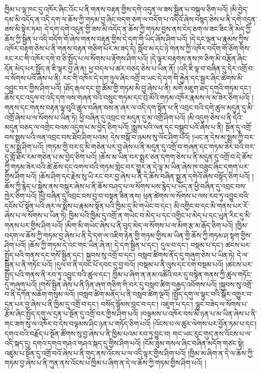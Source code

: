 ཁྱིམ་པ་ལྷ་ཁང་དུ་འཁོར་ཞིང་འོང་པ་ནི་གནས་བརྟན་གྱིས་དགེ་འདུན་ལ་ཟས་སྦྱིན་པ་བསྐུལ་ཅིག་པའོ། །མི་བྱེད་དམ་མི་འདོད་ན་འདི་དག་ལ་ཆོས་ཀྱི་གཏམ་བྱ་ཞིང་བདག་ཅག་ལ་བདོག་པ་འདིའོ་ཞེས་བསྙད་ཅེས་པ་ནི་དགེ་འདུན་ཟས་མི་སྟེར་ཏམ། དེ་དག་དགེ་འདུན་གྱི་ཟས་མི་འདོད་ན་ཆོས་ཀྱི་གཏམ་བྱས་ནས་ངེད་ཅག་ལ་ཟང་ཟིང་ནི་མེད་ཀྱི་ཆོས་ཀྱི་སྦྱིན་པ་འདི་བདོག་གོ་ཞེས་གནས་བརྟན་གྱིས་དེ་དག་གི་ཡིད་ཞོས་ཤིག་པའོ། །དེ་དང་ལྡན་པ་རྣམས་ཀྱིས་འཁོར་བརྟག་ཅེས་པ་ནི་གནས་བརྟན་གཅིག་པོར་མ་ཟད་དེ། སློབ་མ་དང་ཉེ་གནས་ཀྱི་འཁོར་བདོག་གོ་ཅོག་གིས་རང་རང་གི་འཁོར་དགེ་བ་ཅི་སྤྱོད་པ་ལ་སོགས་པ་རྟོགས་ཤིག་པའོ། །དེ་ལྟར་བརྟགས་ནས་ཁ་ཅིག་མི་བརྩོན་ཞིང་དོན་མེད་པར་སྤྱོད་ན་ཇི་ལྟར་བྱ་ཞེ་ན། ཕྱ་བདལ་པ་ཚར་བཅད་ཅེས་པ་ཡིན་ནོ། །འདི་ཇི་ལྟ་བ་བཞིན་དུ་དེར་འགྲོ་བ་ལ་སོགས་པའོ་ཞེས་པ་ནི། རང་གི་འཁོར་དེ་དག་ཉུལ་ཞིང་འགྲོ་བ་ཡང་དེ་དག་གི་རྐྱེན་དང་སྦྱར་ཞིང་ཚེགས་མི་འབྱུང་བར་གྱིས་ཤིག་པའོ། །ཐོད་རྒལ་དང་གྱ་ཚོམ་གྱི་གཏམ་མི་བྱ་ཞེས་པ་ནི། མགོ་མཇུག་ཐད་དགུའི་གཏམ་དང་། ཆོས་དང་འདུལ་བ་འདི་དག་ལས་གཞན་བའི་བསྲུང་གཏམ་དང་བྲེ་མོའི་གཏམ་འཁོར་རྣམས་ལ་མ་ཟེར་ཅིག་པའོ། །གནས་དང་གནས་བརྟན་ལྟ་བུའི་ཚུལ་བཞིན་བས་ན་ཞར་ལ་འདི་དག་སྟོན་པ་ནི་འབྲང་བའི་དགེ་ཚུལ་མདུན་དུ་མི་འགྲོ་ཞེས་པ་ལ་སོགས་པ་ཡིན་ཏེ། ཕྱི་བཞིན་དུ་འབྲང་བ་མདུན་དུ་མ་འགྲོ་ཤིག་པའོ། །མི་འདུག་ཅེས་པ་ནི་དེའི་མདུན་བཅད་ལ་འགྲེང་བའམ་འདུག་པ་མ་བྱེད་ཅིག་པའོ། །སྨྲས་པའི་ལན་དང་བསྒྲུབ་པའོ་ཞེས་པ་ནི། སྔོན་དུ་འགྲོ་བས་སྨྲས་པའི་ལན་འབྲང་བས་ཐོབ་ཤིག་པའམ། དེས་བསྒོ་བ་ཉམས་སུ་ལོང་ཤིག་པའོ། །ཡང་ན་དེས་མ་སྨྲས་ཀྱི་བར་དུ་མ་སྨྲ་ཤིག་པའོ། །གཏམ་གྱི་བར་དུ་མི་གཅེན་པར་བྱ་ཞེས་པ་ནི་མདུན་དུ་འགྲོ་བ་གཞན་དང་གཏམ་ཟེར་བའི་བར་དུ་གློ་ཐོར་རམ་གཅེན་པ་མ་བྱེད་ཅིག་པའོ། །ཆོས་མ་ཡིན་བར་སྨྲར་ཅན་དགག་ཅེས་པ་ནི་མདུན་དུ་འགྲོ་བ་དེ་ཆོས་ཀྱི་གཏམ་ཟེར་བའི་ཚེ་ཆོས་དང་འགལ་བའི་གཏམ་གླེང་བར་གྱུར་ན་དེ་ལྟ་མ་ཡིན་ཞེས་ཁ་བཟུང་ཞིང་དགག་པར་གྱིས་ཤིག་པའོ། །ཆོས་ཤིག་དང་རྗེས་སུ་ཡི་རང་བར་བྱ་ཞེས་པ་ནི་དེ་ཆོས་བཞིན་སྨྲ་ན་དགེའོ་ཞེས་བསྟོད་ཅིག་པའོ། །ཆོས་ཀྱི་རྙེད་པ་སྐྱེས་ནས་བསྐུར་ཞེས་པ་ནི་ཆོས་བཤད་པ་ལ་སོགས་པས་རྙེད་པ་ཡོད་ན་ཕྱི་བཞིན་དུ་འབྲང་བས་ཁྱེར་ཅིག་པའོ། །ཕྱི་བཞིན་དུ་འབྲང་བས་བྱ་བ་བསྟན་ཟིན་ནས། ཕྲན་ཚེགས་ལ་སོགས་པ་ལས་རབ་ཏུ་འབྱུང་བའི་དངོས་པོ་སྟོན་པའི་ཞར་ལ་སྨོས་པ་རྣམས་སྟོན་པའི་ཁྱིམ་དུ་མི་གཡེང་བ་དང་། མི་འགྱིང་བ་དང་མི་གནས་པར་རོ་ཞེས་པ་ལ་སོགས་པ་ཡིན་ཏེ། ཁྱིམ་པའི་ཁྱིམ་དུ་འགྲོ་ན་གཡེང་བ་མེད་པ་དང་འགྱིང་པ་མེད་པ་དང་ཡུན་རིང་དུ་མི་གནས་པར་གྱིས་ཤིག་པའོ། །མིག་མི་གཡེང་ཞེས་པ་ནི་བུད་མེད་ལ་སོགས་པ་ལ་མིག་རྩ་མ་རྒོད་ཅིག་པའོ། །ཁྱིམ་བདག་ལ་ཆོས་ཀྱི་གཏམ་བྱ་ཞེས་པ་ནི་དེ་དག་ལ་འཇིག་རྟེན་གྱི་གཏམ་གྱིས་མ་ཡིན་གྱི་ཆོས་ཀྱི་གཏམ་ཤ་སྟག་གྱིས་ཤིག་པའོ། །ཆོས་ཀྱི་གཏམ་དེ་འང་གང་ཡིན་ཞེ་ན། དེ་དག་སྦྱིན་པ་དང་། དུལ་བ་དང་། བསྡམ་པ་དང་། ཚངས་པར་སྤྱོད་པའི་གནས་དང་གསོ་སྦྱིན་དང་། སྐྱབས་སུ་འགྲོ་བ་དང་། བསླབ་ཚིགས་ནོད་དུ་གཞུག་ཅེས་པ་ཡིན་ཏེ། དེ་ལ་སྦྱིན་པ་ནི་གཏོང་པའོ། །དུལ་བ་ནི་དབང་པོ་དབང་དུ་བྱ་བའོ། །བསྡམ་པ་ནི་ལུས་དང་ངག་བསྡམ་པའོ། །ཚངས་པར་སྤྱོད་པའི་གནས་ནི་རབ་ཏུ་འབྱུང་བའི་ཚུལ་དང་། ཁྱིམ་པ་ཞིག་ན་ནམ་འཚོའི་བར་དུ་བསྙེན་གནས་ཀྱི་ཚུལ་གཏོང་དུ་གཞུག་པའོ། །གསོ་སྦྱིན་ཞེས་པ་ནི་ཉིན་ཞག་གཅིག་གི་བར་དུ་བསླབ་ཚིག་བརྒྱད་འབོགས་པའོ། །སྐྱབས་སུ་འགྲོ་བ་ནི་དཀོན་མཆོག་གསུམ་ལའོ། །བསླབ་ཚིག་མནོད་པ་ནི་བསླབ་ཚིག་ལྔའོ། །སྤྱོད་དགུ་ལ་ལྟུང་བའི་སྒོར་འགྱུར་བ་དྲན་པར་བྱ་ཞེས་པ་ནི་ཁྱིམ་དུ་འགྲོ་བ་དང་། བསོད་སྙོམས་བླང་བ་དང་། འཇུག་པ་དང་། ལྷུང་བཟེད་ལ་སོགས་པ་རྩོམ་ཞིང་སྤྱོད་དགུ་ལ་དྲན་པ་སྔོན་དུ་འགྲོ་བར་གྱིས་ཤིག་པའོ། །བལྟམས་པ་འཁོར་བས་མི་ཉན་པ་མ་ཡིན་ཞེས་པ་ནི་གང་ཟག་སུ་ལ་འཁོར་བ་དེས་བལྟམས་ཤིང་ཉན་པ་གཏོད་ཅིག་པའོ། །འོངས་པ་ལ་ཚུར་ལེགས་པར་བྱོན་ཏམ་པ་དང་། དགའ་བའི་བརྗོད་པ་སྔོན་ཚོགས་སུ་བྱ་ཞེས་པ་ནི་ཁྱིམ་པའམ་རབ་ཏུ་བྱུང་བ། གང་ཡང་རུང་གུད་ནས་འོངས་པ་ལ་འདི་སྐད་དུ། དགའ་དགའ་གཤའ་གཤའ་སྐད་དུ་གྱིས་ཤིག་པའོ། །ངོམ་ཟུམ་གསལ་ཞིང་བཞིན་མདོག་གཙང་སྟེ། འཛུམ་པ་སྔོན་དུ་འགྲོ་བའོ་ཞེས་པ་ནི་གུད་ནས་འོངས་པ་ལ་འདི་ལྟར་གྱིས་ཤིག་པའོ། །ཁྱིམ་མ་ཞིག་ན་དེ་ལ་ཆོས་ཀྱི་གཏམ་བྱ་ཞེས་པ་ནི་ཀུན་ནས་འོངས་པ་ཁྱིམ་པ་ཞིག་ན་དེ་ལ་ཆོས་ཀྱི་གཏམ་གྱིས་ཤིག་པའོ། །
